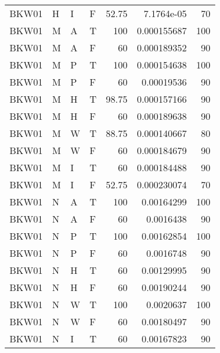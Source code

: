 \begin{longtable}{llllrrr}
    BKW01    & H         & I         & F          & 52.75      & 7.1764e-05  & 70       \\
    BKW01    & M         & A         & T          & 100        & 0.000155687 & 100      \\
    BKW01    & M         & A         & F          & 60         & 0.000189352 & 90       \\
    BKW01    & M         & P         & T          & 100        & 0.000154638 & 100      \\
    BKW01    & M         & P         & F          & 60         & 0.00019536  & 90       \\
    BKW01    & M         & H         & T          & 98.75      & 0.000157166 & 90       \\
    BKW01    & M         & H         & F          & 60         & 0.000189638 & 90       \\
    BKW01    & M         & W         & T          & 88.75      & 0.000140667 & 80       \\
    BKW01    & M         & W         & F          & 60         & 0.000184679 & 90       \\
    BKW01    & M         & I         & T          & 60         & 0.000184488 & 90       \\
    BKW01    & M         & I         & F          & 52.75      & 0.000230074 & 70       \\
    BKW01    & N         & A         & T          & 100        & 0.00164299  & 100      \\
    BKW01    & N         & A         & F          & 60         & 0.0016438   & 90       \\
    BKW01    & N         & P         & T          & 100        & 0.00162854  & 100      \\
    BKW01    & N         & P         & F          & 60         & 0.0016748   & 90       \\
    BKW01    & N         & H         & T          & 60         & 0.00129995  & 90       \\
    BKW01    & N         & H         & F          & 60         & 0.00190244  & 90       \\
    BKW01    & N         & W         & T          & 100        & 0.0020637   & 100      \\
    BKW01    & N         & W         & F          & 60         & 0.00180497  & 90       \\
    BKW01    & N         & I         & T          & 60         & 0.00167823  & 90       \\

\end{longtable}
